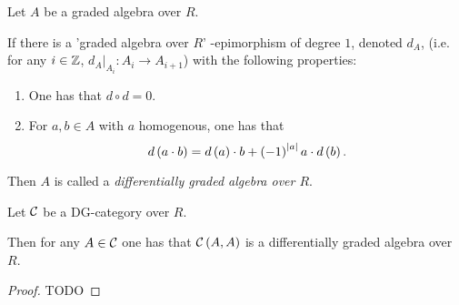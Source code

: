 \begin{definition}
    Let \( A \) be a graded algebra over \( R \).

    If there is a 'graded algebra over \( R \)' -epimorphism of degree \( 1 \), denoted \( d_A \), (i.e. for any \( i \in {\mathbb{Z}} \), \( d_A |_{A_i}: A_i \to A_{i + 1} \))
    with the following properties:
    \begin{enumerate}
        \item One has that \( d \circ d = 0 \).
        \item {
            For \( a, b \in A \) with \( a \) homogenous, one has that
            \[
                d\left( a \cdot b \right)
                =
                d\left( a \right) \cdot b + \left( -1 \right)^{\lvert a \rvert}a \cdot d\left( b \right).
            \]
            }
    \end{enumerate}

    Then \( A \) is called a \emph{differentially graded algebra over \( R \)}.
\end{definition}

\begin{theorem}
    Let \( {\mathcal{C}} \) be a DG-category over \( R \).

    Then for any \( A \in {\mathcal{C}} \) one has that \( {\mathcal{C}} \left( A, A \right) \) is a differentially graded algebra over \( R \).
\end{theorem}

\begin{proof}
    TODO
\end{proof}
